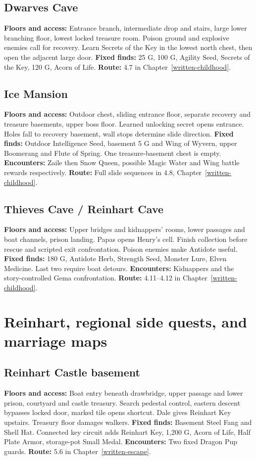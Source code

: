\subsection{Dwarves Cave}
\label{atlas-dwarves}
\textbf{Floors and access:} Entrance branch, intermediate drop and stairs, large lower branching floor, lowest locked treasure room. Poison ground and explosive enemies call for recovery. Learn Secrets of the Key in the lowest north chest, then open the adjacent large door. \textbf{Fixed finds:} 25 G, 100 G, Agility Seed, Secrets of the Key, 120 G, Acorn of Life. \textbf{Route:} 4.7 in Chapter~\ref{written-childhood}.

\subsection{Ice Mansion}
\label{atlas-ice}
\textbf{Floors and access:} Outdoor chest, sliding entrance floor, separate recovery and treasure basements, upper boss floor. Learned unlocking secret opens entrance. Holes fall to recovery basement, wall stops determine slide direction. \textbf{Fixed finds:} Outdoor Intelligence Seed, basement 5 G and Wing of Wyvern, upper Boomerang and Flute of Spring. One treasure-basement chest is empty. \textbf{Encounters:} Zaile then Snow Queen, possible Magic Water and Wing battle rewards respectively. \textbf{Route:} Full slide sequences in 4.8, Chapter~\ref{written-childhood}.

\subsection{Thieves Cave / Reinhart Cave}
\label{atlas-thieves}
\textbf{Floors and access:} Upper bridges and kidnappers' rooms, lower passages and boat channels, prison landing. Papas opens Henry's cell. Finish collection before rescue and scripted exit confrontation. Poison enemies make Antidote useful. \textbf{Fixed finds:} 180 G, Antidote Herb, Strength Seed, Monster Lure, Elven Medicine. Last two require boat detours. \textbf{Encounters:} Kidnappers and the story-controlled Gema confrontation. \textbf{Route:} 4.11--4.12 in Chapter~\ref{written-childhood}.

\section{Reinhart, regional side quests, and marriage maps}
\subsection{Reinhart Castle basement}
\label{atlas-reinhart}
\textbf{Floors and access:} Boat entry beneath drawbridge, upper passage and lower prison, courtyard and castle treasury. Search pedestal control, eastern descent bypasses locked door, marked tile opens shortcut. Dale gives Reinhart Key upstairs. Treasury floor damages walkers. \textbf{Fixed finds:} Basement Steel Fang and Shell Hat. Connected key circuit adds Reinhart Key, 1,200 G, Acorn of Life, Half Plate Armor, storage-pot Small Medal. \textbf{Encounters:} Two fixed Dragon Pup guards. \textbf{Route:} 5.6 in Chapter~\ref{written-escape}.

